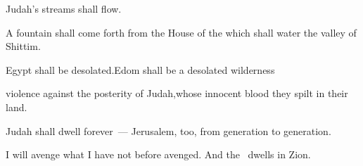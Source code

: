\begin{inparaenum}
  \pa{}Judah's streams shall flow\pa{}.%

  \pa{}A fountain shall come forth from the House of the \lord\pa{}which shall water the valley of Shittim.%

  \pa{} Egypt shall be desolated.\pa{}Edom shall be a desolated wilderness%

  \pa{} violence against the posterity of Judah,\pa{}whose innocent blood they spilt in their land.%

  \pa{} Judah shall dwell forever~--- Jerusalem, too, from generation to generation.%

  \pa{} I will avenge what I have not before avenged. And the \lord\ dwells in Zion.%
\end{inparaenum}
